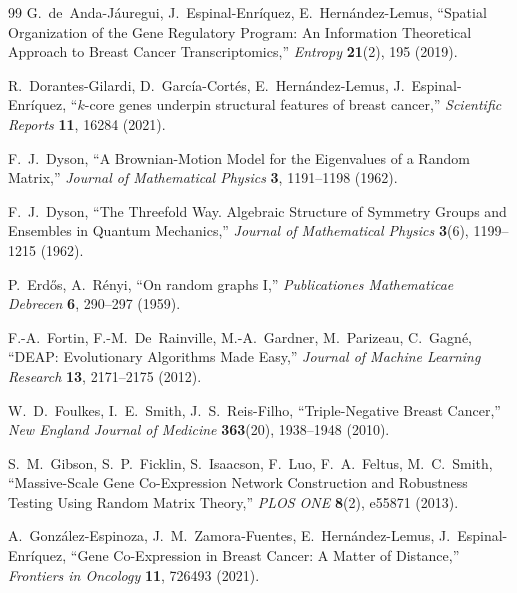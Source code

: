 \documentclass[11pt]{article}
\begin{document}
\begin{thebibliography}{99}
G.~de~Anda-J\'auregui, J.~Espinal-Enr\'iquez, E.~Hern\'andez-Lemus,
\newblock ``Spatial Organization of the Gene Regulatory Program: An Information Theoretical Approach to Breast Cancer Transcriptomics,''
\newblock \emph{Entropy} \textbf{21}(2), 195 (2019).

R.~Dorantes-Gilardi, D.~Garc\'ia-Cort\'es, E.~Hern\'andez-Lemus, J.~Espinal-Enr\'iquez,
\newblock ``$k$-core genes underpin structural features of breast cancer,''
\newblock \emph{Scientific Reports} \textbf{11}, 16284 (2021).

F.~J.~Dyson,
\newblock ``A Brownian-Motion Model for the Eigenvalues of a Random Matrix,''
\newblock \emph{Journal of Mathematical Physics} \textbf{3}, 1191--1198 (1962).

F.~J.~Dyson,
\newblock ``The Threefold Way. Algebraic Structure of Symmetry Groups and Ensembles in Quantum Mechanics,''
\newblock \emph{Journal of Mathematical Physics} \textbf{3}(6), 1199--1215 (1962).

P.~Erd\H{o}s, A.~R\'enyi,
\newblock ``On random graphs I,''
\newblock \emph{Publicationes Mathematicae Debrecen} \textbf{6}, 290--297 (1959).

F.-A.~Fortin, F.-M.~De~Rainville, M.-A.~Gardner, M.~Parizeau, C.~Gagn\'e,
\newblock ``DEAP: Evolutionary Algorithms Made Easy,''
\newblock \emph{Journal of Machine Learning Research} \textbf{13}, 2171--2175 (2012).

W.~D.~Foulkes, I.~E.~Smith, J.~S.~Reis-Filho,
\newblock ``Triple-Negative Breast Cancer,''
\newblock \emph{New England Journal of Medicine} \textbf{363}(20), 1938--1948 (2010).

S.~M.~Gibson, S.~P.~Ficklin, S.~Isaacson, F.~Luo, F.~A.~Feltus, M.~C.~Smith,
\newblock ``Massive-Scale Gene Co-Expression Network Construction and Robustness Testing Using Random Matrix Theory,''
\newblock \emph{PLOS ONE} \textbf{8}(2), e55871 (2013).

A.~Gonz\'alez-Espinoza, J.~M.~Zamora-Fuentes, E.~Hern\'andez-Lemus, J.~Espinal-Enr\'iquez,
\newblock ``Gene Co-Expression in Breast Cancer: A Matter of Distance,''
\newblock \emph{Frontiers in Oncology} \textbf{11}, 726493 (2021).


\end{thebibliography}
\end{document}
